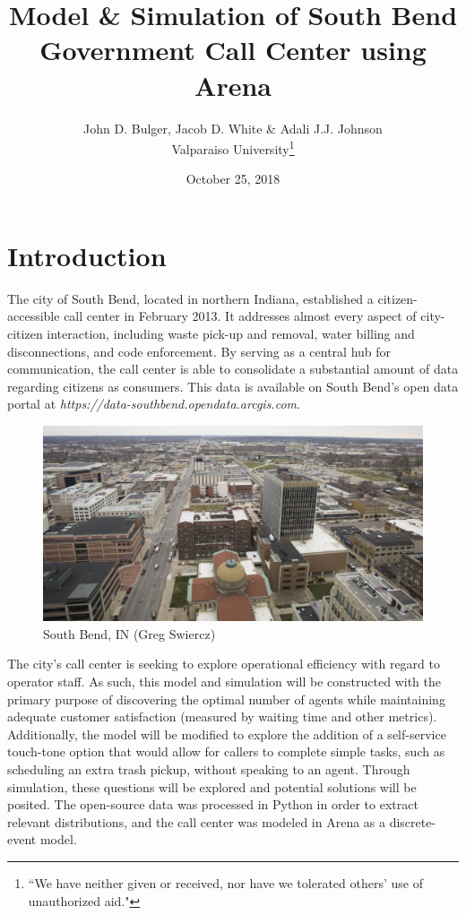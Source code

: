 \documentclass[12pt,twocolumn]{article}
\title{Model \& Simulation of South Bend Government Call Center using Arena}
\author{John D. Bulger, Jacob D. White \& Adali J.J. Johnson\\Valparaiso University\thanks{``We have neither given or received, nor have we tolerated others' use of unauthorized aid."}}
\date{October 25, 2018}
\begin{document}
\maketitle

\section{Introduction}
The city of South Bend, located in northern Indiana, established a citizen-accessible call center in February 2013.  It addresses almost every aspect of city-citizen interaction, including waste pick-up and removal, water billing and disconnections, and code enforcement.  By serving as a central hub for communication, the call center is able to consolidate a substantial amount of data regarding citizens as consumers.  This data is available on South Bend's open data portal at \textit{https://data-southbend.opendata.arcgis.com}.

	\begin{figure}[h]
	\includegraphics[scale=.17]{south_bend.png}
	\caption{South Bend, IN (Greg Swiercz)}
	\end{figure}

\par
The city's call center is seeking to explore operational efficiency with regard to operator staff.  As such, this model and simulation will be constructed with the primary purpose of discovering the optimal number of agents while maintaining adequate customer satisfaction (measured by waiting time and other metrics).  Additionally, the model will be modified to explore the addition of a self-service touch-tone option that would allow for callers to complete simple tasks, such as scheduling an extra trash pickup, without speaking to an agent.  Through simulation, these questions will be explored and potential solutions will be posited.  The open-source data was processed in Python in order to extract relevant distributions, and the call center was modeled in Arena as a discrete-event model.  
\end{document}
